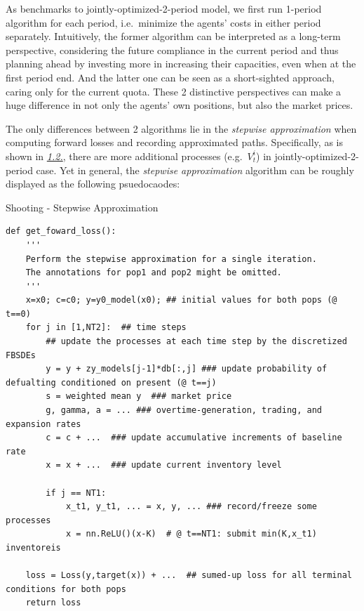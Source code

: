 \documentclass{article}
\begin{document}
As benchmarks to jointly-optimized-2-period model, we first run 1-period
algorithm for each period, i.e.~minimize the agents' costs in either
period separately. Intuitively, the former algorithm can be interpreted
as a long-term perspective, considering the future compliance in the
current period and thus planning ahead by investing more in increasing
their capacities, even when at the first period end. And the latter one
can be seen as a short-sighted approach, caring only for the current
quota. These 2 distinctive perspectives can make a huge difference in
not only the agents' own positions, but also the market prices.

The only differences between 2 algorithms lie in the \emph{stepwise
approximation} when computing forward losses and recording approximated
paths. Specifically, as is shown in \protect\hyperlink{rec-market-modeling}{\emph{1.2.}},
there are more additional processes (e.g.~\(V_t^i\)) in
jointly-optimized-2-period case. Yet in general, the \emph{stepwise
approximation} algorithm can be roughly displayed as the following
psuedocaodes:

\begin{algorithm}
\caption{Shooting - Stepwise Approximation} \label{alg:cap}
\begin{verbatim}
def get_foward_loss():
    '''
    Perform the stepwise approximation for a single iteration. 
    The annotations for pop1 and pop2 might be omitted.
    '''
    x=x0; c=c0; y=y0_model(x0); ## initial values for both pops (@ t==0)
    for j in [1,NT2]:  ## time steps
        ## update the processes at each time step by the discretized FBSDEs
        y = y + zy_models[j-1]*db[:,j] ### update probability of defualting conditioned on present (@ t==j)
        s = weighted mean y  ### market price
        g, gamma, a = ... ### overtime-generation, trading, and expansion rates 
        c = c + ...  ### update accumulative increments of baseline rate
        x = x + ...  ### update current inventory level

        if j == NT1:
            x_t1, y_t1, ... = x, y, ... ### record/freeze some processes 
            x = nn.ReLU()(x-K)  # @ t==NT1: submit min(K,x_t1) inventoreis

    loss = Loss(y,target(x)) + ...  ## sumed-up loss for all terminal conditions for both pops
    return loss 
\end{verbatim}
\end{algorithm}
\end{document}
